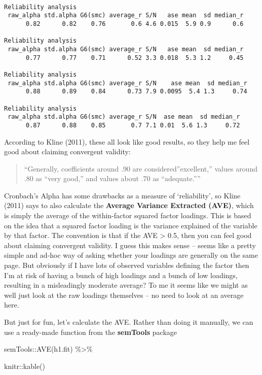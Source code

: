 \documentclass[
  letterpaper,
  DIV=11,
  numbers=noendperiod]{scrreprt}
\newenvironment{Shaded}{\begin{snugshade}}{\end{snugshade}}
\newcommand{\FunctionTok}[1]{\textcolor[rgb]{0.28,0.35,0.67}{#1}}
\newcommand{\NormalTok}[1]{\textcolor[rgb]{0.00,0.23,0.31}{#1}}
\newcommand{\SpecialCharTok}[1]{\textcolor[rgb]{0.37,0.37,0.37}{#1}}
\begin{document}
\begin{verbatim}

Reliability analysis   
 raw_alpha std.alpha G6(smc) average_r S/N   ase mean  sd median_r
      0.82      0.82    0.76       0.6 4.6 0.015  5.9 0.9      0.6

Reliability analysis   
 raw_alpha std.alpha G6(smc) average_r S/N   ase mean  sd median_r
      0.77      0.77    0.71      0.52 3.3 0.018  5.3 1.2     0.45

Reliability analysis   
 raw_alpha std.alpha G6(smc) average_r S/N    ase mean  sd median_r
      0.88      0.89    0.84      0.73 7.9 0.0095  5.4 1.3     0.74

Reliability analysis   
 raw_alpha std.alpha G6(smc) average_r S/N  ase mean  sd median_r
      0.87      0.88    0.85       0.7 7.1 0.01  5.6 1.3     0.72
\end{verbatim}

According to Kline (2011), these all look like good results, so they
help me feel good about claiming convergent validity:

\begin{quote}
``Generally, coefficients around .90 are considered''excellent,'' values
around .80 as ``very good,'' and values about .70 as ``adequate.''''
\end{quote}

Cronbach's Alpha has some drawbacks as a measure of `reliability', so
Kline (2011) says to also calculate the \textbf{Average Variance
Extracted (AVE)}, which is simply the average of the within-factor
squared factor loadings. This is based on the idea that a squared factor
loading is the variance explained of the variable by that factor. The
convention is that if the AVE \textgreater{} 0.5, then you can feel good
about claiming convergent validity. I guess this makes sense -- seems
like a pretty simple and ad-hoc way of asking whether your loadings are
generally on the same page. But obviously if I have lots of observed
variables defining the factor then I'm at risk of having a bunch of high
loadings and a bunch of low loadings, resulting in a misleadingly
moderate average? To me it seems like we might as well just look at the
raw loadings themselves -- no need to look at an average here.

But just for fun, let's calculate the AVE. Rather than doing it
manually, we can use a ready-made function from the \textbf{semTools}
package

\begin{Shaded}
\begin{Highlighting}[]
\NormalTok{semTools}\SpecialCharTok{::}\FunctionTok{AVE}\NormalTok{(h1.fit) }\SpecialCharTok{\%\textgreater{}\%} 
  
\NormalTok{  knitr}\SpecialCharTok{::}\FunctionTok{kable}\NormalTok{()}
\end{Highlighting}
\end{Shaded}
\end{document}
